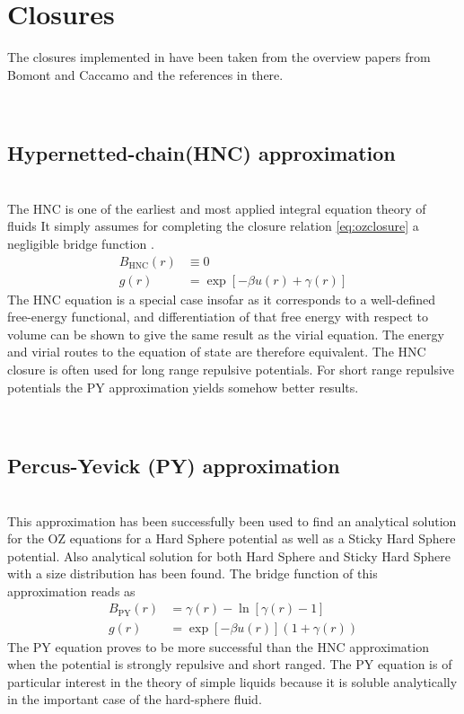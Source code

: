 \section{Closures}

The closures implemented in \SASfit have been taken from the overview papers from Bomont \cite{Bomont2008}
and Caccamo \cite{Caccamo1996} and the references in there.

~\\
\subsection{Hypernetted-chain(HNC) approximation}
~\\

The HNC is one of the earliest and most applied integral equation theory of fluids \cite{Hansen2013}
It simply assumes for completing the closure relation
\ref{eq:ozclosure} a negligible bridge function \cite{Caccamo1996,Bomont2008,Hansen2013}.
\begin{align} \label{eq:ozBHNC}
B_\text{HNC}(r) &\equiv 0 \\
g(r)&=\exp\left[ -\beta u(r) +\gamma(r)\right]
\end{align}
The HNC equation is a special case insofar as it corresponds to a
well-defined free-energy functional, and differentiation of that
free energy with respect to volume can be shown to give the same
result as the virial equation. The energy and virial routes to the
equation of state are therefore equivalent.
The HNC closure is often used for long range repulsive potentials.
For short range repulsive potentials the PY approximation yields
somehow better results.

~\\
\subsection{Percus-Yevick (PY) approximation}
~\\

This approximation has been successfully been used to find an analytical solution for
the OZ equations for a Hard Sphere potential as well as a Sticky Hard Sphere potential.
Also analytical solution for both Hard Sphere \cite{Percus1958,Wertheim1963} and
Sticky Hard Sphere  \cite{Baxter1968} with a size distribution has been found.
The bridge function of this approximation reads as
\begin{align} \label{eq:ozBHNC}
B_\text{PY}(r) &=\gamma(r)-\ln\left[\gamma(r)-1\right] \\
g(r)&= \exp\left[ -\beta u(r)\right]\left(1 +\gamma(r)\right)
\end{align}
The PY equation proves to be more successful than the HNC
approximation when the potential is strongly repulsive and short
ranged. The PY equation is of particular interest in the theory of
simple liquids because it is soluble analytically in the important
case of the hard-sphere fluid.

